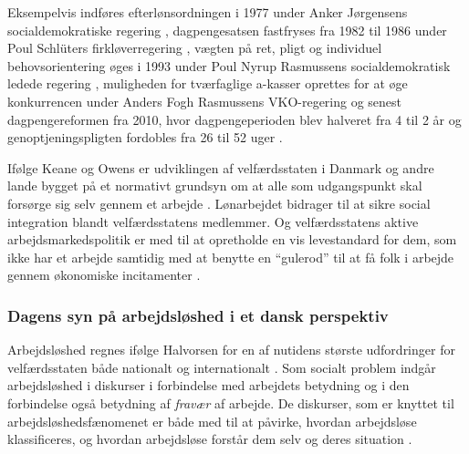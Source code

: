 % 
Eksempelvis indføres efterlønsordningen i 1977 under Anker Jørgensens socialdemokratiske regering \parencite[86]{Pedersen2007}, dagpengesatsen fastfryses fra 1982 til 1986 under Poul Schlüters firkløverregering \parencite[88]{Pedersen2007}, vægten på ret, pligt og individuel behovsorientering øges i 1993 under Poul Nyrup Rasmussens socialdemokratisk ledede regering \parencite[92]{Pedersen2007}, muligheden for tværfaglige a-kasser oprettes for at øge konkurrencen under Anders Fogh Rasmussens VKO-regering \parencite[97]{Pedersen2007} og senest dagpengereformen fra 2010, hvor dagpengeperioden blev halveret fra 4 til 2 år og genoptjeningspligten fordobles fra 26 til 52 uger \parencite{lov_dagpenge}. %

Ifølge Keane og Owens er udviklingen af velfærdsstaten i Danmark og andre lande bygget på et normativt grundsyn om at alle som udgangspunkt skal forsørge sig selv gennem et arbejde \textbf{\parencite[18]{Keane1986}}. Lønarbejdet bidrager til at sikre social integration blandt velfærdsstatens medlemmer. Og velfærdsstatens aktive arbejdsmarkedspolitik er med til at opretholde en vis levestandard for dem, som ikke har et arbejde samtidig med at benytte en “gulerod” til at få folk i arbejde gennem økonomiske incitamenter \textbf{\parencite[7]{Halvorsen1999}}. %


\subsubsection{Dagens syn på arbejdsløshed i et dansk perspektiv} 

Arbejdsløshed regnes ifølge Halvorsen for en af nutidens største udfordringer for velfærdsstaten både nationalt og internationalt \textbf{\parencite[8]{Halvorsen1999}}. Som socialt problem indgår arbejdsløshed i diskurser i forbindelse med arbejdets betydning og i den forbindelse også betydning af \textit{fravær} af arbejde. De diskurser, som er knyttet til arbejdsløshedsfænomenet er både med til at påvirke, hvordan arbejdsløse klassificeres, og hvordan arbejdsløse forstår dem selv og deres situation \textbf{\parencite[12]{Halvorsen1999}}. %

